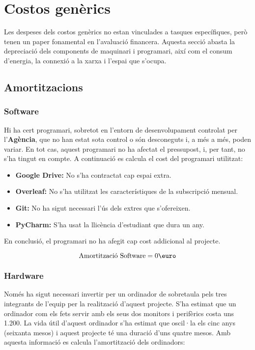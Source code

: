 \section{Costos genèrics}
Les despeses dels costos genèrics no estan vinculades a tasques específiques, però tenen un paper fonamental en l'avaluació financera. Aquesta secció abasta la depreciació dels components de maquinari i programari, així com el consum d'energia, la connexió a la xarxa i l'espai que s'ocupa. 

\subsection{Amortitzacions}
\subsubsection{Software}
Hi ha cert programari, sobretot en l'entorn de desenvolupament controlat per l'\textbf{Agència}, que no han estat sota control o són desconeguts i, a més a més, poden variar. En tot cas, aquest programari no ha afectat el pressupost, i, per tant, no s'ha tingut en compte. A continuació es calcula el cost del programari utilitzat:

\begin{itemize}
    \item \textbf{Google Drive:} No s'ha contractat cap espai extra.
    \item \textbf{Overleaf:} No s'ha utilitzat les característiques de la subscripció mensual.
    \item \textbf{Git:} No ha sigut necessari l'ús dels extres que s'ofereixen.
    \item \textbf{PyCharm:} S'ha usat la llicència d'estudiant que dura un any.
\end{itemize}

En conclusió, el programari no ha afegit cap cost addicional al projecte.

$$
\text{Amortització Software} = 0\text{\euro}
$$

\subsubsection{Hardware}
Només ha sigut necessari invertir per un ordinador de sobretaula pels tres integrants de l'equip per la realització d'aquest projecte. S'ha estimat que un ordinador com els fets servir amb els seus dos monitors i perifèrics costa uns 1.200\text{\euro}. La vida útil d'aquest ordinador s'ha estimat que oscil·la els cinc anys (seixanta mesos) i aquest projecte té una duració d'uns quatre mesos. Amb aquesta informació es calcula l'amortització dels ordinadors:


